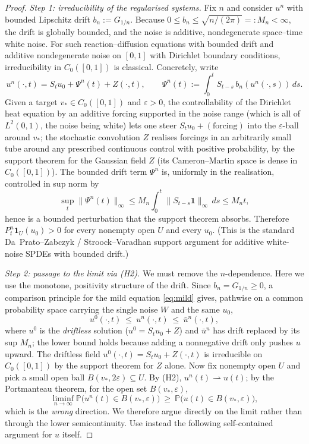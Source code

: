 \documentclass[11pt]{article}
\newcommand{\PP}{\mathbb{P}}
\newcommand{\C}{C_0([0,1])}
\begin{document}
\begin{proof}
\emph{Step 1: irreducibility of the regularised systems.}
Fix $n$ and consider $u^n$ with bounded Lipschitz drift $b_n:=G_{1/n}$. Because
$0\le b_n\le \sqrt{n/(2\pi)}=:M_n<\infty$, the drift is globally bounded, and the
noise is additive, nondegenerate space--time white noise. For such
reaction--diffusion equations with bounded drift and additive nondegenerate
noise on $[0,1]$ with Dirichlet boundary conditions, irreducibility in $\C$ is
classical. Concretely, write
\[
u^n(\cdot,t)=S_t u_0+\Psi^n(t)+Z(\cdot,t),\qquad
\Psi^n(t):=\int_0^t S_{t-s}\,b_n(u^n(\cdot,s))\,ds .
\]
Given a target $v_\ast\in\C$ and $\varepsilon>0$, the controllability of the
Dirichlet heat equation by an additive forcing supported in the noise range
(which is all of $L^2(0,1)$, the noise being white) lets one steer
$S_tu_0+(\text{forcing})$ into the $\varepsilon$-ball around $v_\ast$; the
stochastic convolution $Z$ realises forcings in an arbitrarily small tube around
any prescribed continuous control with positive probability, by the support
theorem for the Gaussian field $Z$ (its Cameron--Martin space is dense in
$\C$). The bounded drift term $\Psi^n$ is, uniformly in the realisation,
controlled in sup norm by
\[
\sup_t\|\Psi^n(t)\|_\infty\le M_n\!\int_0^t\!\|S_{t-s}\mathbf
1\|_\infty\,ds\le M_n t,
\]
hence is a bounded perturbation that the support theorem absorbs. Therefore
$P^n_t\mathbf 1_U(u_0)>0$ for every nonempty open $U$ and every $u_0$. (This is
the standard Da~Prato--Zabczyk / Stroock--Varadhan support argument for additive
white-noise SPDEs with bounded drift.)

\emph{Step 2: passage to the limit via (H2).}
We must remove the $n$-dependence. Here we use the monotone, positivity
structure of the drift. Since $b_n=G_{1/n}\ge0$, a comparison principle for the
mild equation \eqref{eq:mild} gives, pathwise on a common probability space
carrying the single noise $W$ and the same $u_0$,
\[
u^0(\cdot,t)\ \le\ u^n(\cdot,t)\ \le\ \bar u^n(\cdot,t),
\]
where $u^0$ is the \emph{driftless} solution
($u^0=S_tu_0+Z$) and $\bar u^n$ has drift replaced by its sup $M_n$; the lower
bound holds because adding a nonnegative drift only pushes $u$ upward. The
driftless field $u^0(\cdot,t)=S_tu_0+Z(\cdot,t)$ is irreducible on $\C$ by the
support theorem for $Z$ alone. Now fix nonempty open $U$ and pick a small open
ball $B(v_\ast,2\varepsilon)\subseteq U$. By (H2), $u^n(t)\rightharpoonup u(t)$;
by the Portmanteau theorem, for the open set $B(v_\ast,\varepsilon)$,
\[
\liminf_{n\to\infty}\PP\big(u^n(t)\in B(v_\ast,\varepsilon)\big)
\ \ge\ \PP\big(u(t)\in B(v_\ast,\varepsilon)\big),
\]
which is the \emph{wrong} direction. We therefore argue directly on the limit
rather than through the lower semicontinuity. Use instead the following
self-contained argument for $u$ itself.


\end{proof}
\end{document}
